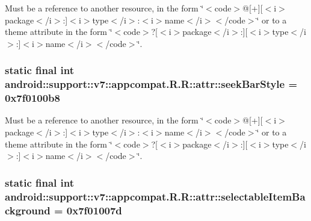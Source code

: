 Must be a reference to another resource, in the form \char`\"{}$<$code$>$@\mbox{[}+\mbox{]}\mbox{[}$<$i$>$package$<$/i$>$:\mbox{]}$<$i$>$type$<$/i$>$:$<$i$>$name$<$/i$>$$<$/code$>$\char`\"{} or to a theme attribute in the form \char`\"{}$<$code$>$?\mbox{[}$<$i$>$package$<$/i$>$:\mbox{]}\mbox{[}$<$i$>$type$<$/i$>$:\mbox{]}$<$i$>$name$<$/i$>$$<$/code$>$\char`\"{}. \hypertarget{classandroid_1_1support_1_1v7_1_1appcompat_1_1_r_1_1attr_d5d9e62031ea31eea1fef2032ceea5af}{
\subsubsection[{seekBarStyle}]{\setlength{\rightskip}{0pt plus 5cm}static final int android::support::v7::appcompat.R.R::attr::seekBarStyle = 0x7f0100b8}}
\label{classandroid_1_1support_1_1v7_1_1appcompat_1_1_r_1_1attr_d5d9e62031ea31eea1fef2032ceea5af}


Must be a reference to another resource, in the form \char`\"{}$<$code$>$@\mbox{[}+\mbox{]}\mbox{[}$<$i$>$package$<$/i$>$:\mbox{]}$<$i$>$type$<$/i$>$:$<$i$>$name$<$/i$>$$<$/code$>$\char`\"{} or to a theme attribute in the form \char`\"{}$<$code$>$?\mbox{[}$<$i$>$package$<$/i$>$:\mbox{]}\mbox{[}$<$i$>$type$<$/i$>$:\mbox{]}$<$i$>$name$<$/i$>$$<$/code$>$\char`\"{}. \hypertarget{classandroid_1_1support_1_1v7_1_1appcompat_1_1_r_1_1attr_4c4fe078915414a184c54a14daeff9b3}{
\subsubsection[{selectableItemBackground}]{\setlength{\rightskip}{0pt plus 5cm}static final int android::support::v7::appcompat.R.R::attr::selectableItemBackground = 0x7f01007d}}
\label{classandroid_1_1support_1_1v7_1_1appcompat_1_1_r_1_1attr_4c4fe078915414a184c54a14daeff9b3}


